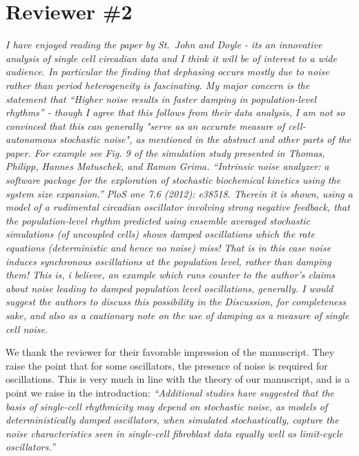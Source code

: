 \documentclass[11pt, letterpaper]{article}
\newenvironment{reviewer}{\itshape\color{gray}}{}
\begin{document}
\section*{Reviewer \#2}
\begin{reviewer}
I have enjoyed reading the paper by St.\ John and Doyle - its an innovative analysis of single cell circadian data and I think it will be of interest to a wide audience. 
In particular the finding that dephasing occurs mostly due to noise rather than period heterogeneity is fascinating. 
My major concern is the statement that ``Higher noise results in faster damping in population-level rhythms'' - though I agree that this follows from their data analysis, I am not so convinced that this can generally "serve as an accurate measure of cell-autonomous stochastic noise", as mentioned in the abstract and other parts of the paper. 
For example see Fig. 9 of the simulation study presented in Thomas, Philipp, Hannes Matuschek, and Ramon Grima. 
``Intrinsic noise analyzer: a software package for the exploration of stochastic biochemical kinetics using the system size expansion.'' PloS one 7.6 (2012): e38518.
Therein it is shown, using a model of a rudimental circadian oscillator involving strong negative feedback, that the population-level rhythm predicted using ensemble averaged stochastic simulations (of uncoupled cells) shows damped oscillations which the rate equations (deterministic and hence no noise) miss!
That is in this case noise induces synchronous oscillations at the population level, rather than damping them! This is, i believe, an example which runs counter to the author's claims about noise leading to damped population level oscillations, generally. 
I would suggest the authors to discuss this possibility in the Discussion, for completeness sake, and also as a cautionary note on the use of damping as a measure of single cell noise.
\end{reviewer}

We thank the reviewer for their favorable impression of the manuscript.
They raise the point that for some oscillators, the presence of noise is required for oscillations.
This is very much in line with the theory of our manuscript, and is a point we raise in the introduction:
{\itshape
``Additional studies have suggested that the basis of single-cell rhythmicity may depend on stochastic noise, as models of deterministically damped oscillators, when simulated stochastically, capture the noise characteristics seen in single-cell fibroblast data equally well as limit-cycle oscillators.''}
\end{document}
